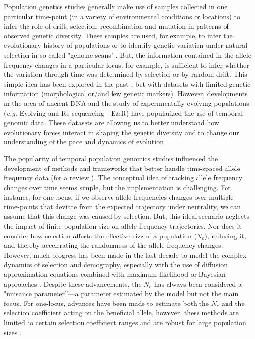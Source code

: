 \documentclass[12pt]{article}
\begin{document}
Population genetics studies generally make use of samples collected in one particular time-point  (in a variety of environmental conditions or locations) to infer the role of drift, selection, recombination and mutation in patterns of observed genetic diversity. These samples are used, for example, to infer the evolutionary history of populations \citep{Pool:2010eh} or to identify genetic variation under natural selection in so-called "genome scans" \citep{Nielsen:2005kx,Scheinfeldt:2013iz}. But, the information contained in the allele frequency changes in a particular locus, for example, is sufficient to infer whether the variation through time was determined by selection or by random drift. This simple idea has been explored in the past \citep{Fisher:1947jm,Wright:1948bt,Mueller:1985ug}, but with datasets with limited genetic information (morphological or/and few genetic markers). However, developments in the area of ancient DNA \citep{Racimo:2016ea} and the study of experimentally evolving populations (\textit{e.g.} Evolving and Re-sequencing - E\&R) \citep{Barghi:2019gw,Kofler:2014if} have popularized the use of temporal genomic data. These datasets are allowing us to better understand how evolutionary forces interact in shaping the genetic diversity \citep{Navascues:2010in} and to change our understanding of the pace and dynamics of evolution \citep{Feder:2016bc,Feder:2018ic}. 
 
The popularity of temporal population genomics studies influenced the development of methods and frameworks that better handle time-spaced allele frequency data (for a review \citet{Malaspinas:2015do}). The conceptual idea of tracking allele frequency changes over time seems simple, but the implementation is challenging. For instance, for one-locus, if we observe allele frequencies changes over multiple time-points that deviate from the expected trajectory under neutrality, we can assume that this change was caused by selection. But, this ideal scenario neglects the impact of finite population size on allele frequency trajectories. Nor does it consider how selection affects the effective size of a population ($N_{e}$), reducing it, and thereby accelerating the randomness of the allele frequency changes. However, much progress has been made in the last decade to model the complex dynamics of selection and demography, especially with the use of diffusion approximation equations combined with maximum-likelihood or Bayesian approaches \citep{Malaspinas:2015do, FerrerAdmetlla:2016jc,Schraiber:2016ks}. Despite these advancements, the $N_{e}$ has always been considered a "nuisance parameter”—a parameter estimated by the model but not the main focus. For one-locus, advances have been made to estimate both the $N_{e}$ and the selection coefficient acting on the beneficial allele, however, these methods are limited to certain selection coefficient ranges and are robust for large population sizes \citep{Bollback:2008br, Malaspinas:2012dv,Feder:2014fe}.
\end{document}
